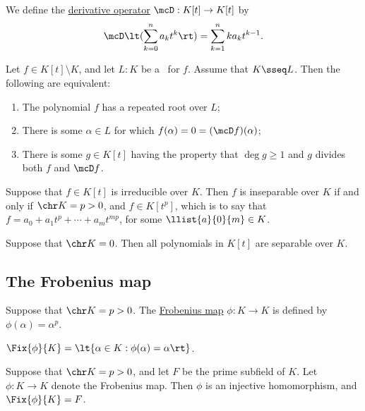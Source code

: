 \documentclass{article}
\begin{document}
  \begin{tdefinition}
    We define the \ul{derivative operator} \( \mcD:K[t]\to K[t] \) by \begin{align*}
      \mcD\lt(\sum_{k=0}^{n}a_kt^k\rt) = \sum_{k=1}^{n}ka_kt^{k-1}.
    \end{align*}
  \end{tdefinition}

  \begin{ttheorem}
    Let \( f\in K[t]\setminus K \), and let \( L:K \) be a \sfe~for \( f \).
    Assume that \( K\sseq L \).
    Then the following are equivalent: \begin{enumerate}[label=(\roman*)]
      \item The polynomial \( f \) has a repeated root over \( L \);
      \item There is some \( \alpha\in L \) for which \( f(\alpha)=0=(\mcD f)(\alpha) \);
      \item There is some \( g\in K[t] \) having the property that \( \deg g \geq 1 \) and \( g \) divides both \( f \) and \( \mcD f \).
    \end{enumerate}
  \end{ttheorem}

  \begin{ttheorem}
    Suppose that \( f\in K[t] \) is irreducible over \( K \).
    Then \( f \) is inseparable over \( K \) if and only if \( \chr K=p>0 \), and \( f \in K[t^p] \), which is to say that \( f=a_0+a_1t^p+\cdots+a_mt^{mp} \), for some \( \llist{a}{0}{m}\in K \).
  \end{ttheorem}

  \begin{tcorollary}
    Suppose that \( \chr K = 0 \).
    Then all polynomials in \( K[t] \) are separable over \( K \).
  \end{tcorollary}

\subsection{The Frobenius map}
  \begin{tdefinition}
    Suppose that \( \chr K = p > 0 \).
    The \ul{Frobenius map} \( \phi:K\to K \) is defined by \( \phi(\alpha)=\alpha^p \).
  \end{tdefinition}

   \( \Fix{\phi}{K}=\lt\{ \alpha\in K:\phi(\alpha)=\alpha \rt\} \).

  \begin{ttheorem}
    Suppose that \( \chr K = p>0 \), and let \( F \) be the prime subfield of \( K \).
    Let \( \phi:K\to K \) denote the Frobenius map.
    Then \( \phi \) is an injective homomorphism, and \( \Fix{\phi}{K} = F \).
  \end{ttheorem}
\end{document}
